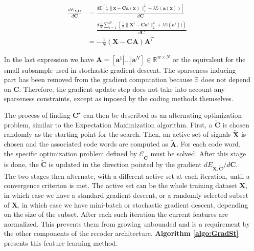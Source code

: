 \documentclass[12pt,a4paper,oneside,english]{UPBThesis}
\newcommand{\hctimes}[2]{{#1}\!\times\!{#2}}
\begin{document}
\begin{align*}
\frac{d E_{\textbf{X},\textbf{C}}}{d\textbf{C}} & = \frac{d\mathbb{E} [ \frac{1}{2} \| \textbf{x} - \textbf{C}\textbf{a}(\textbf{x}) \|_2^2 + \lambda\mathbb{S}(\textbf{a}(\textbf{x}))]}{d\textbf{C}} \\
& = \frac{d\frac{1}{N} \sum_{i=1}^N{\left( \frac{1}{2} \| \textbf{X}^i - \textbf{C}\textbf{a}^i \|_2^2 + \lambda\mathbb{S}(\textbf{a}^i)) \right)}}{d\textbf{C}} \\
& = - \frac{1}{N} \left( \textbf{X} - \textbf{C}\textbf{A} \right) \textbf{A}^T
\end{align*}

In the last expression we have $\textbf{A} = \left[ \textbf{a}^1 \left|\right. \dots \left|\right. \textbf{a}^N \right] \in \mathbb{R}^{\hctimes{w}{N}}$ or the equivalent for the small subsample used in stochastic gradient descent. The sparseness inducing part has been removed from the gradient computation because $\mathbb{S}$ does not depend on $\textbf{C}$. Therefore, the gradient update step does not take into account any sparseness constraints, except as inposed by the coding methods themselves.

The process of finding $\textbf{C}^\star$ can then be described as an alternating optimization problem, similar to the Expectation Maximization algorithm. First, a $\tilde{\textbf{C}}$ is chosen randomly as the starting point for the search. Then, an active set of signals $\tilde{\textbf{X}}$ is chosen and the associated code words are computed as $\tilde{\textbf{A}}$. For each code word, the specific optimization problem defined by $\mathcal{C}_{\tilde{\textbf{C}}}$ must be solved. After this stage is done, the $\tilde{\textbf{C}}$ is updated in the direction pointed by the gradient $dE_{\tilde{\textbf{X}},\tilde{\textbf{C}}} / d\textbf{C}$. The two stages then alternate, with a different active set at each iteration, until a convergence criterion is met. The active set can be the whole training dataset $\textbf{X}$, in which case we have a standard gradient descent, or a randomly selected subset of $\textbf{X}$, in which case we have mini-batch or stochastic gradient descent, depending on the size of the subset. After each such iteration the current features are normalized. This prevents them from growing unbounded and is a requirement by the other components of the recoder architecture. \textbf{Algorithm \ref{algo:GradSt}} presents this feature learning method.
\end{document}
